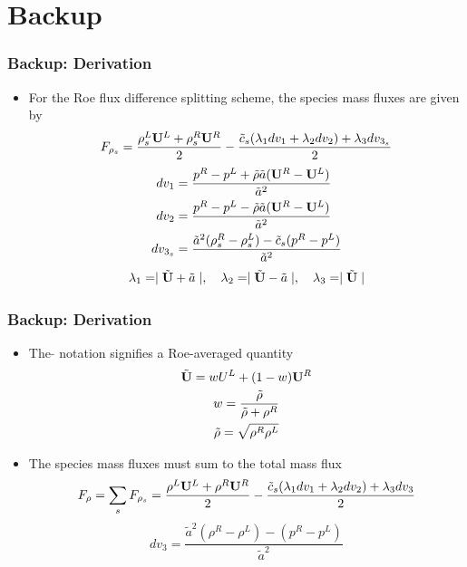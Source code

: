 \documentclass{beamer}
\begin{document}
\section*{Backup}
\begin{frame}
  \frametitle{Backup: Derivation}
  \begin{itemize}
    \item For the Roe flux difference splitting scheme, the species mass fluxes are given by
  \[
  	F_{\rho_s} = \frac{\rho_s^L{{\bf U}}^L+\rho_s^R{{\bf U}}^R}{2}
  	-\frac{\tilde{c}_s(\lambda_1 dv_1 + \lambda_2 dv_2)+\lambda_3 dv_{3_s}}{2}
  \]
  \begin{align*}	
  		dv_1 &= \frac{p^R-p^L+\tilde{\rho} \tilde{a}
      ({{\bf U}}^R-{{\bf U}}^L)}{\tilde{a}^2} \\
  		dv_2 &= \frac{p^R-p^L-\tilde{\rho} \tilde{a}
      ({{\bf U}}^R-{{\bf U}}^L)}{\tilde{a}^2} \\
  		dv_{3_s} &= \frac{\tilde{a}^2 (\rho_s^R-\rho_s^L)- \tilde{c}_s (p^R-p^L)}{\tilde{a}^2}
  \end{align*}
  \begin{align*}
  	\lambda_1 = \mid \tilde{{\bf U}}+\tilde{a} \mid,\quad 
  	\lambda_2 = \mid \tilde{{\bf U}}-\tilde{a} \mid,\quad 
  	\lambda_3 = \mid \tilde{{\bf U}} \mid
  \end{align*}
  \end{itemize}
\end{frame}
\begin{frame}
  \frametitle{Backup: Derivation}
  \begin{itemize}
    \item The $\tilde{}$ notation signifies a Roe-averaged quantity
    \begin{gather*}
    	\tilde{{{\bf U}}} =w{U}^L+(1-w){{\bf U}}^R \\
    	w = \frac{\tilde{\rho}}{\tilde{\rho}+\rho^R} \\
    	\tilde{\rho} = \sqrt{\rho^R\rho^L}
    \end{gather*}
    \item The species mass fluxes must sum to the total mass flux
    \[ F_\rho = \sum\limits_{s}{F_{\rho_s}} =
      \frac{\rho^L{{\bf U}}^L+\rho^R{{\bf U}}^R}{2}
    	-\frac{\tilde{c}_s(\lambda_1 dv_1 + \lambda_2 dv_2)+\lambda_3 dv_3}{2} \]
    \[ dv_3 = \frac{\tilde{a}^2 (\rho^R-\rho^L)-(p^R-p^L)}{\tilde{a}^2} \]
  \end{itemize}
\end{frame}
\end{document}
